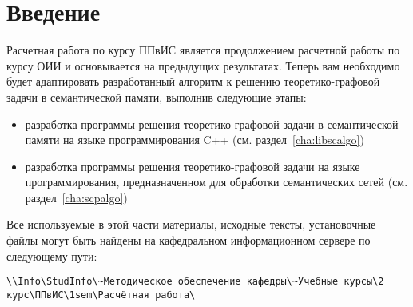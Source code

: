 
{}
\section*{Введение}
\label{sec:ppvis_intro}

Расчетная работа по курсу ППвИС является продолжением расчетной работы
по курсу ОИИ и основывается на предыдущих результатах. Теперь вам
необходимо будет адаптировать разработанный алгоритм к решению
теоретико-графовой задачи в семантической памяти, выполнив следующие
этапы:

\begin{itemize}
\item разработка программы решения теоретико-графовой задачи в
  семантической памяти на языке программирования C++
  (см. раздел~\ref{cha:libscalgo})
\item разработка программы решения теоретико-графовой задачи на языке
  программирования, предназначенном для обработки семантических сетей
  (см. раздел~\ref{cha:scpalgo})
\end{itemize}

Все используемые в этой части материалы, исходные тексты, установочные
файлы могут быть найдены на кафедральном информационном
сервере по следующему пути:

{\footnotesize
\begin{verbatim}
\\Info\StudInfo\~Методическое обеспечение кафедры\~Учебные курсы\2 курс\ППвИС\1sem\Расчётная работа\
\end{verbatim}
}

